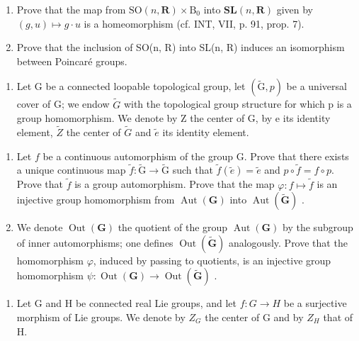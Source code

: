 \begin{enumerate}
\def\labelenumi{\alph{enumi})}
\item
  Prove that the map from \(\mathrm{SO}(n,\mathbf{R})\times\mathrm{B}_{0}\) into \(\mathbf{SL}(n,\mathbf{R})\) given by \((g,u)\mapsto g\cdot u\) is a homeomorphism (cf. INT, VII, p. 91, prop. 7).
\item
  Prove that the inclusion of SO(n, R) into SL(n, R) induces an isomorphism between Poincaré groups.
\end{enumerate}

\begin{enumerate}
\def\labelenumi{\arabic{enumi})}
\setcounter{enumi}{4}
\tightlist
\item
  Let G be a connected loopable topological group, let \((\widetilde{\mathrm{G}}, p)\) be a universal cover of G; we endow \(\widetilde{G}\) with the topological group structure for which p is a group homomorphism. We denote by Z the center of G, by e its identity element, \(\widetilde{Z}\) the center of \(\widetilde{G}\) and \(\widetilde{e}\) its identity element.
\end{enumerate}

\begin{enumerate}
\def\labelenumi{\alph{enumi})}
\item
  Let \(f\) be a continuous automorphism of the group G. Prove that there exists a unique continuous map \(\widetilde{f} \colon \widetilde{\mathrm{G}} \to \widetilde{\mathrm{G}}\) such that \(\widetilde{f}(\widetilde{e}) = \widetilde{e}\) and \(p \circ \widetilde{f} = f \circ p\). Prove that \(\widetilde{f}\) is a group automorphism. Prove that the map \(\varphi \colon f \mapsto \widetilde{f}\) is an injective group homomorphism from \(\operatorname{Aut}(\mathbf{G})\) into \(\operatorname{Aut}(\widetilde{\mathbf{G}})\) .
\item
  We denote \(\operatorname{Out}(\mathbf{G})\) the quotient of the group \(\operatorname{Aut}(\mathbf{G})\) by the subgroup of inner automorphisms; one defines \(\operatorname{Out}(\widetilde{\mathbf{G}})\) analogously. Prove that the homomorphism \(\varphi\), induced by passing to quotients, is an injective group homomorphism \(\psi\colon\operatorname{Out}(\mathbf{G})\to\operatorname{Out}(\widetilde{\mathbf{G}})\) .
\end{enumerate}

\begin{enumerate}
\def\labelenumi{\arabic{enumi})}
\setcounter{enumi}{5}
\tightlist
\item
  Let G and H be connected real Lie groups, and let \(f: G \to H\) be a surjective morphism of Lie groups. We denote by \(Z_{G}\) the center of G and by \(Z_{H}\) that of H.
\end{enumerate}

